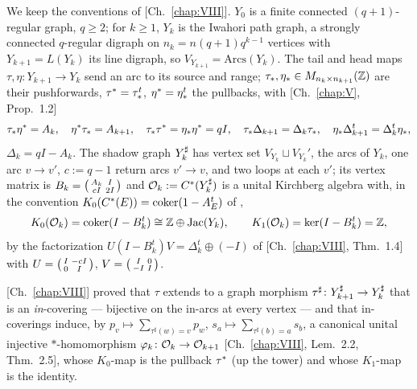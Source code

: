 We keep the conventions of [Ch.~\ref{chap:VIII}]. $Y_0$ is a finite connected $(q{+}1)$-regular graph,
$q\ge2$; for $k\ge1$, $Y_k$ is the Iwahori path graph, a strongly connected $q$-regular
digraph on $n_k=n(q{+}1)q^{k-1}$ vertices with $Y_{k+1}=L(Y_k)$ its line digraph, so
$V_{Y_{k+1}}=\mathrm{Arcs}(Y_k)$. The tail and head maps $\tau,\eta\colon Y_{k+1}\to Y_k$
send an arc to its source and range; $\tau_*,\eta_*\in M_{n_k\times n_{k+1}}(\mathbb{Z})$ are their
pushforwards, $\tau^*=\tau_*^{t}$, $\eta^*=\eta_*^{t}$ the pullbacks, with [Ch.~\ref{chap:V}, Prop.~1.2]
\begin{equation}\label{XVI:eq:calc}
\tau_*\eta^*=A_k,\quad \eta^*\tau_*=A_{k+1},\quad \tau_*\tau^*=\eta_*\eta^*=qI,\quad
\tau_*\Delta_{k+1}=\Delta_k\tau_*,\quad \eta_*\Delta_{k+1}^{t}=\Delta_k^{t}\eta_*,
\end{equation}
$\Delta_k=qI-A_k$. The shadow graph $Y_{k}^{\sharp}$ has vertex set $V_{Y_k}\sqcup V_{Y_k}'$,
the arcs of $Y_k$, one arc $v\to v'$, $c:=q-1$ return arcs $v'\to v$, and two loops at
each $v'$; its vertex matrix is $B_k=\begin{psmallmatrix}A_k&I\\cI&2I\end{psmallmatrix}$
and $\mathcal{O}_k:=C^*(Y_{k}^{\sharp})$ is a unital Kirchberg algebra with, in the convention
$K_0(C^*(E))=\operatorname{coker}(1-A_E^{t})$ of \cite[Thm.~7.16]{R},
\begin{equation}\label{XVI:eq:ktheory}
K_0(\mathcal{O}_k)=\operatorname{coker}(I-B_k^{t})\cong\mathbb{Z}\oplus\operatorname{Jac}(Y_k),\qquad K_1(\mathcal{O}_k)=\ker(I-B_k^{t})=\mathbb{Z} ,
\end{equation}
by the factorization $U(I-B_k^{t})V=\Delta_k^{t}\oplus(-I)$ of [Ch.~\ref{chap:VIII}, Thm.~1.4] with
$U=\begin{psmallmatrix}I&-cI\\0&I\end{psmallmatrix}$,
$V=\begin{psmallmatrix}I&0\\-I&I\end{psmallmatrix}$.

[Ch.~\ref{chap:VIII}] proved that $\tau$ extends to a graph morphism $\tau^{\sharp}\colon Y_{k+1}^{\sharp}\to
Y_{k}^{\sharp}$ that is an \emph{in}-covering --- bijective on the in-arcs at every vertex --- and
that in-coverings induce, by $p_v\mapsto\sum_{\tau^\sharp(w)=v}p_w$,
$s_a\mapsto\sum_{\tau^\sharp(b)=a}s_b$, a canonical unital injective $*$-homomorphism
$\varphi_k\colon\mathcal{O}_k\to\mathcal{O}_{k+1}$ [Ch.~\ref{chap:VIII}, Lem.~2.2, Thm.~2.5], whose $K_0$-map is the
pullback $\tau^*$ (up the tower) and whose $K_1$-map is the identity.

